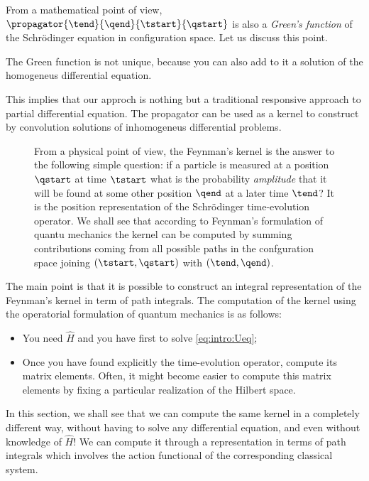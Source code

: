 From a mathematical point of view,
$\propagator{\tend}{\qend}{\tstart}{\qstart}$ is also a \emph{Green's function}
of the Schr\"odinger equation in configuration space. Let us discuss this
point.

The Green function is not unique, because you can also add to it a solution of
the homogeneus differential equation.


This implies that our approch is nothing but a traditional responsive approach
to partial differential equation. The propagator can be used as a kernel to
construct by convolution solutions of inhomogeneus differential problems.

\begin{figure}
   \centering
   \caption{From a physical point of view, the Feynman's kernel is the answer
      to the following simple question: if a particle is measured at a position $\qstart$ at time
      $\tstart$ what is the probability \emph{amplitude} that it will be found
      at some other position $\qend$ at a later time $\tend$? It is the
      position representation of the Schr\"odinger time-evolution operator. We shall see that
      according to Feynman's formulation of quantu mechanics the kernel can be
      computed by summing contributions coming from all possible paths in the
      confguration space joining
      $(\tstart, \qstart)$ with $(\tend, \qend)$.\label{fig:multiple paths}}
\end{figure}



The main point is that it is possible to construct an integral representation of
the Feynman's kernel in term  of path integrals.
The  computation of the
kernel using the operatorial formulation of quantum mechanics is as follows:
\begin{itemize}
   \item You need $\hat{H}$ and you have first to solve \cref{eq:intro:Ueq};
   \item Once you have found explicitly the time-evolution operator, compute
      its matrix elements. Often, it might become easier to compute this matrix
      elements by fixing a particular realization of the Hilbert space.
\end{itemize}
In this section, we shall see that we can compute the same kernel in a
completely different way, without having to solve any differential equation,
and even without knowledge of $\hat{H}$! We can compute it through a
representation in terms of path integrals which involves the action functional
of the corresponding classical system.



